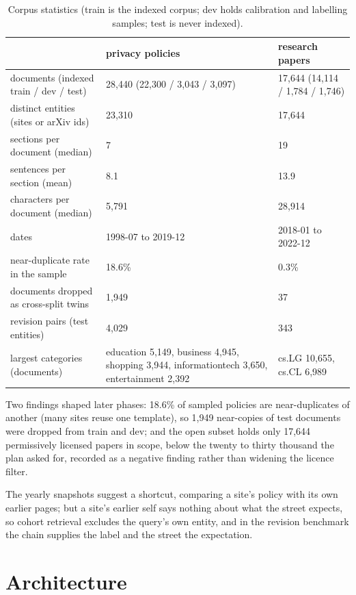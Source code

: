 \documentclass[11pt,a4paper]{article}
\begin{document}
\begin{table}[!htbp]
\centering\small
\begin{adjustbox}{max width=\linewidth}
\begin{tabular}{lP{7.5cm}l}
\toprule
 & privacy policies & research papers \\
\midrule
documents (indexed train / dev / test) & 28,440 (22,300 / 3,043 / 3,097) & 17,644 (14,114 / 1,784 / 1,746) \\
distinct entities (sites or arXiv ids) & 23,310 & 17,644 \\
sections per document (median) & 7 & 19 \\
sentences per section (mean) & 8.1 & 13.9 \\
characters per document (median) & 5,791 & 28,914 \\
dates & 1998-07 to 2019-12 & 2018-01 to 2022-12 \\
near-duplicate rate in the sample & 18.6\% & 0.3\% \\
documents dropped as cross-split twins & 1,949 & 37 \\
revision pairs (test entities) & 4,029 & 343 \\
largest categories (documents) & education 5,149, business 4,945, shopping 3,944, informationtech 3,650, entertainment 2,392 & cs.LG 10,655, cs.CL 6,989 \\
\bottomrule
\end{tabular}
\end{adjustbox}
\caption{Corpus statistics (train is the indexed corpus; dev holds calibration and labelling samples; test is never indexed).}
\end{table}

Two findings shaped later phases: 18.6\% of sampled policies are near-duplicates of another (many sites reuse one template), so 1,949 near-copies of test documents were dropped from train and dev;  and the open subset holds only 17,644 permissively licensed papers in scope, below the twenty to thirty thousand the plan asked for, recorded as a negative finding rather than widening the licence filter.

The yearly snapshots suggest a shortcut, comparing a site's policy with its own earlier pages; but a site's earlier self says nothing about what the street expects, so cohort retrieval excludes the query's own entity, and in the revision benchmark the chain supplies the label and the street the expectation.

\section{Architecture}
\end{document}
